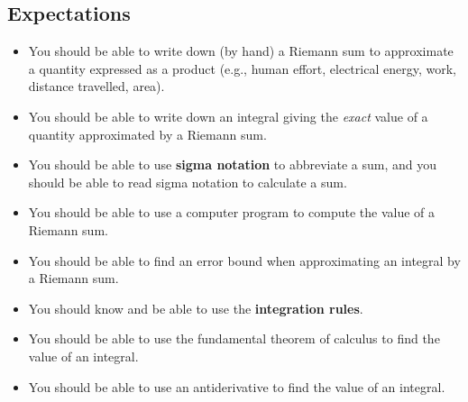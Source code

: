 \subsection{Expectations}
\label{subsec:expectations}

\begin{itemize}

\item You should be able to write down (by hand) a Riemann sum to
  approximate a quantity expressed as a product (e.g., human effort,
  electrical energy, work, distance travelled, area).

\item You should be able to write down an integral giving the {\em
  exact} value of a quantity approximated by a Riemann sum.

\item You should be able to use {\bf sigma notation} to abbreviate a sum, and you should be able to read sigma
  notation to calculate a sum.

\item You should be able to use a computer program to compute the
  value of a Riemann sum.

\item You should be able to find an error bound when approximating an
  integral by a Riemann sum.

\item You should know and be able to use the {\bf integration
  rules}.

\item You should be able to use the fundamental theorem of calculus to
  find the value of an integral.

\item You should be able to use an antiderivative to find the value of
  an integral.



\end{itemize}

\cleardoublepage